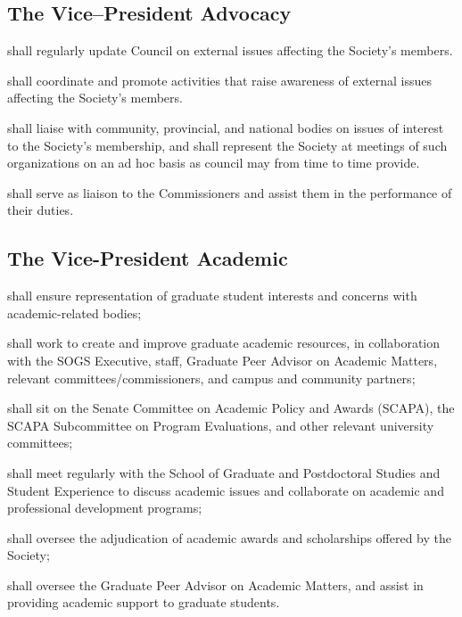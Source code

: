 \subsection {The Vice--President Advocacy}
\begin{longenum}[ label*=\thesubsection.\arabic*., align=left]
	\item shall regularly update Council on external issues affecting the Society's members.
    \item shall coordinate and promote activities that raise awareness of external issues affecting the Society's members.
    \item shall liaise with community, provincial, and national bodies on issues of interest to the Society's membership, and shall represent the Society at meetings of such organizations on an ad hoc basis as council may from time to time provide.
\item shall serve as liaison to the Commissioners and assist them in the performance of their duties.  

\end{longenum}


\subsection {The Vice-President Academic} 
\begin{longenum}[ label*=\thesubsection.\arabic*., align=left]
	\item shall ensure representation of graduate student interests and concerns with academic-related bodies;
    \item shall work to create and improve graduate academic resources, in collaboration with the SOGS Executive, staff, Graduate Peer Advisor on Academic Matters, relevant committees/commissioners, and campus and community partners;
    \item shall sit on the Senate Committee on Academic Policy and Awards (SCAPA), the SCAPA Subcommittee on Program Evaluations, and other relevant university committees;
    \item shall meet regularly with the School of Graduate and Postdoctoral Studies and Student Experience to discuss academic issues and collaborate on academic and professional development programs;
    \item shall oversee the adjudication of academic awards and scholarships offered by the Society;
    \item shall oversee the Graduate Peer Advisor on Academic Matters, and assist in providing academic support to graduate students.
    
\end{longenum}

